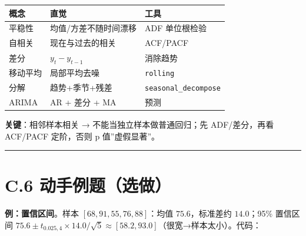 {\def\LTcaptype{none} %
\begin{longtable}[]{@{}lll@{}}
\toprule\noalign{}
概念 & 直觉 & 工具 \\
\midrule\noalign{}
\endhead
\bottomrule\noalign{}
\endlastfoot
平稳性 & 均值/方差不随时间漂移 & ADF 单位根检验 \\
自相关 & 现在与过去的相关 & ACF/PACF \\
差分 & \(y_t-y_{t-1}\) & 消除趋势 \\
移动平均 & 局部平均去噪 & \texttt{rolling} \\
分解 & 趋势+季节+残差 & \texttt{seasonal\_decompose} \\
ARIMA & AR + 差分 + MA & 预测 \\
\end{longtable}
}

\textbf{关键}：相邻样本相关 → 不能当独立样本做普通回归；先
ADF/差分，再看 ACF/PACF 定阶，否则 p 值''虚假显著''。

\begin{center}\rule{0.5\linewidth}{0.5pt}\end{center}

\section{C.6
动手例题（选做）}\label{c.6-ux52a8ux624bux4f8bux9898ux9009ux505a}

\textbf{例：置信区间}。样本 \([68,91,55,76,88]\)：均值
\(75.6\)，标准差约 \(14.0\)；95\% 置信区间
\(75.6\pm t_{0.025,4}\times 14.0/\sqrt5\approx[58.2,93.0]\)（很宽→样本太小）。代码：

\begin{Shaded}
\begin{Highlighting}[]
\OperatorTok{=}\NormalTok{ np.array([}\NormalTok{, }\NormalTok{, }\NormalTok{, }\NormalTok{, }\NormalTok{])}
\OperatorTok{=}\NormalTok{))}
\OperatorTok{=}\OperatorTok{{-}}\OperatorTok{=}\OperatorTok{=}
\end{Highlighting}
\end{Shaded}

